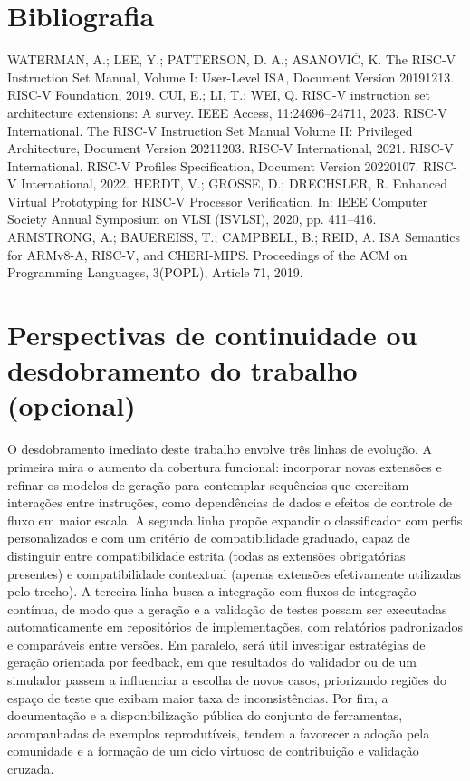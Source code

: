 \documentclass[12pt,a4paper]{article}
\begin{document}
\section{Bibliografia}
\begin{thebibliography}{9}
 WATERMAN, A.; LEE, Y.; PATTERSON, D. A.; ASANOVIĆ, K. The RISC-V Instruction Set Manual, Volume I: User-Level ISA, Document Version 20191213. RISC-V Foundation, 2019.
 CUI, E.; LI, T.; WEI, Q. RISC-V instruction set architecture extensions: A survey. IEEE Access, 11:24696–24711, 2023.
 RISC-V International. The RISC-V Instruction Set Manual Volume II: Privileged Architecture, Document Version 20211203. RISC-V International, 2021.
 RISC-V International. RISC-V Profiles Specification, Document Version 20220107. RISC-V International, 2022.
 HERDT, V.; GROSSE, D.; DRECHSLER, R. Enhanced Virtual Prototyping for RISC-V Processor Verification. In: IEEE Computer Society Annual Symposium on VLSI (ISVLSI), 2020, pp. 411–416.
 ARMSTRONG, A.; BAUEREISS, T.; CAMPBELL, B.; REID, A. ISA Semantics for ARMv8-A, RISC-V, and CHERI-MIPS. Proceedings of the ACM on Programming Languages, 3(POPL), Article 71, 2019.
\end{thebibliography}

\section{Perspectivas de continuidade ou desdobramento do trabalho (opcional)}
O desdobramento imediato deste trabalho envolve três linhas de evolução. A primeira mira o aumento da cobertura funcional: incorporar novas extensões e refinar os modelos de geração para contemplar sequências que exercitam interações entre instruções, como dependências de dados e efeitos de controle de fluxo em maior escala. A segunda linha propõe expandir o classificador com perfis personalizados e com um critério de compatibilidade graduado, capaz de distinguir entre compatibilidade estrita (todas as extensões obrigatórias presentes) e compatibilidade contextual (apenas extensões efetivamente utilizadas pelo trecho). A terceira linha busca a integração com fluxos de integração contínua, de modo que a geração e a validação de testes possam ser executadas automaticamente em repositórios de implementações, com relatórios padronizados e comparáveis entre versões.
\newline
\noindent Em paralelo, será útil investigar estratégias de geração orientada por feedback, em que resultados do validador ou de um simulador passem a influenciar a escolha de novos casos, priorizando regiões do espaço de teste que exibam maior taxa de inconsistências. Por fim, a documentação e a disponibilização pública do conjunto de ferramentas, acompanhadas de exemplos reprodutíveis, tendem a favorecer a adoção pela comunidade e a formação de um ciclo virtuoso de contribuição e validação cruzada.
\end{document}
